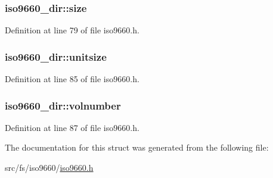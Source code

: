 \hypertarget{structiso9660__dir_a73204b6ab2ae137b1f77476e6c1448da}{
\subsubsection[{size}]{ iso9660\+\_\+dir\+::size}}\label{structiso9660__dir_a73204b6ab2ae137b1f77476e6c1448da}


Definition at line 79 of file iso9660.\+h.

\hypertarget{structiso9660__dir_a526e37b4f96c65db4c2ab5853155ee31}{
\subsubsection[{unitsize}]{ iso9660\+\_\+dir\+::unitsize}}\label{structiso9660__dir_a526e37b4f96c65db4c2ab5853155ee31}


Definition at line 85 of file iso9660.\+h.

\hypertarget{structiso9660__dir_afa69b98db7042e4e30ae0a08f3d6f12d}{
\subsubsection[{volnumber}]{ iso9660\+\_\+dir\+::volnumber}}\label{structiso9660__dir_afa69b98db7042e4e30ae0a08f3d6f12d}


Definition at line 87 of file iso9660.\+h.



The documentation for this struct was generated from the following file\+:\begin{DoxyCompactItemize}
\item 
src/fs/iso9660/\hyperlink{iso9660_8h}{iso9660.\+h}\end{DoxyCompactItemize}
